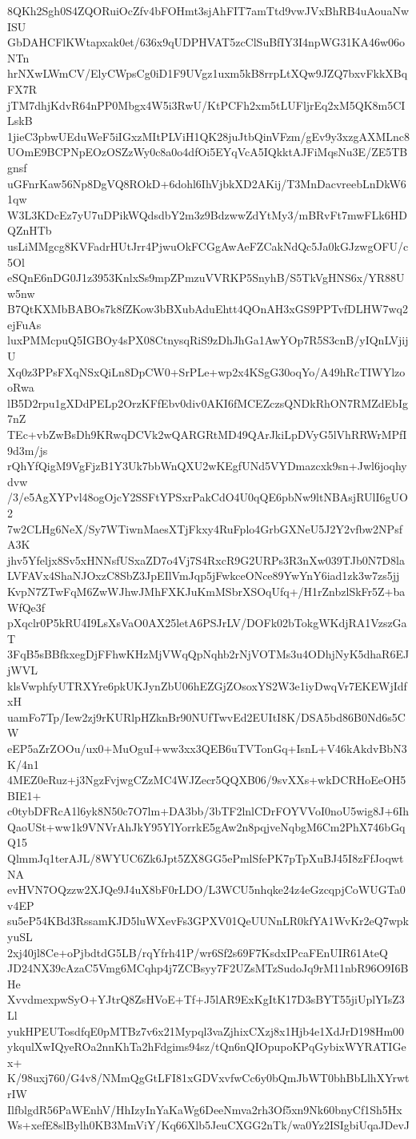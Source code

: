 8QKh2Sgh0S4ZQORuiOcZfv4bFOHmt3sjAhFIT7amTtd9vwJVxBhRB4uAouaNwISU
GbDAHCFlKWtapxak0et/636x9qUDPHVAT5zcClSuBfIY3I4npWG31KA46w06oNTn
hrNXwLWmCV/ElyCWpsCg0iD1F9UVgz1uxm5kB8rrpLtXQw9JZQ7bxvFkkXBqFX7R
jTM7dhjKdvR64nPP0Mbgx4W5i3RwU/KtPCFh2xm5tLUFljrEq2xM5QK8m5CILskB
1jieC3pbwUEduWeF5iIGxzMItPLViH1QK28juJtbQinVFzm/gEv9y3xzgAXMLnc8
UOmE9BCPNpEOzOSZzWy0c8a0o4dfOi5EYqVcA5IQkktAJFiMqsNu3E/ZE5TBgnsf
uGFnrKaw56Np8DgVQ8ROkD+6dohl6IhVjbkXD2AKij/T3MnDacvreebLnDkW61qw
W3L3KDcEz7yU7uDPikWQdsdbY2m3z9BdzwwZdYtMy3/mBRvFt7mwFLk6HDQZnHTb
usLiMMgcg8KVFadrHUtJrr4PjwuOkFCGgAwAeFZCakNdQc5Ja0kGJzwgOFU/c5Ol
eSQnE6nDG0J1z3953KnlxSs9mpZPmzuVVRKP5SnyhB/S5TkVgHNS6x/YR88Uw5nw
B7QtKXMbBABOs7k8fZKow3bBXubAduEhtt4QOnAH3xGS9PPTvfDLHW7wq2ejFuAs
luxPMMcpuQ5IGBOy4sPX08CtnysqRiS9zDhJhGa1AwYOp7R5S3cnB/yIQnLVjijU
Xq0z3PPsFXqNSxQiLn8DpCW0+SrPLe+wp2x4KSgG30oqYo/A49hRcTIWYlzooRwa
lB5D2rpu1gXDdPELp2OrzKFfEbv0div0AKI6fMCEZczsQNDkRhON7RMZdEbIg7nZ
TEc+vbZwBsDh9KRwqDCVk2wQARGRtMD49QArJkiLpDVyG5lVhRRWrMPfI9d3m/js
rQhYfQigM9VgFjzB1Y3Uk7bbWnQXU2wKEgfUNd5VYDmazcxk9sn+Jwl6joqhydvw
/3/e5AgXYPvl48ogOjcY2SSFtYPSxrPakCdO4U0qQE6pbNw9ltNBAsjRUlI6gUO2
7w2CLHg6NeX/Sy7WTiwnMaesXTjFkxy4RuFplo4GrbGXNeU5J2Y2vfbw2NPsfA3K
jhv5Yfeljx8Sv5xHNNsfUSxaZD7o4Vj7S4RxcR9G2URPs3R3nXw039TJb0N7D8la
LVFAVx4ShaNJOxzC8SbZ3JpEIlVmJqp5jFwkceONce89YwYnY6iad1zk3w7zs5jj
KvpN7ZTwFqM6ZwWJhwJMhFXKJuKmMSbrXSOqUfq+/H1rZnbzlSkFr5Z+baWfQe3f
pXqclr0P5kRU4I9LsXsVaO0AX25letA6PSJrLV/DOFk02bTokgWKdjRA1VzszGaT
3FqB5sBBfkxegDjFFhwKHzMjVWqQpNqhb2rNjVOTMs3u4ODhjNyK5dhaR6EJjWVL
klsVwphfyUTRXYre6pkUKJynZbU06hEZGjZOsoxYS2W3e1iyDwqVr7EKEWjIdfxH
uamFo7Tp/Iew2zj9rKURlpHZknBr90NUfTwvEd2EUItI8K/DSA5bd86B0Nd6s5CW
eEP5aZrZOOu/ux0+MuOguI+ww3xx3QEB6uTVTonGq+IsnL+V46kAkdvBbN3K/4n1
4MEZ0eRuz+j3NgzFvjwgCZzMC4WJZecr5QQXB06/9svXXs+wkDCRHoEeOH5BIE1+
c0tybDFRcA1l6yk8N50c7O7lm+DA3bb/3bTF2lnlCDrFOYVVoI0noU5wig8J+6Ih
QaoUSt+ww1k9VNVrAhJkY95YlYorrkE5gAw2n8pqjveNqbgM6Cm2PhX746bGqQ15
QlmmJq1terAJL/8WYUC6Zk6Jpt5ZX8GG5ePmlSfePK7pTpXuBJ45I8zFfJoqwtNA
evHVN7OQzzw2XJQe9J4uX8bF0rLDO/L3WCU5nhqke24z4eGzcqpjCoWUGTa0v4EP
su5eP54KBd3RssamKJD5luWXevFs3GPXV01QeUUNnLR0kfYA1WvKr2eQ7wpkyuSL
2xj40jl8Ce+oPjbdtdG5LB/rqYfrh41P/wr6Sf2s69F7KsdxIPcaFEnUIR61AteQ
JD24NX39cAzaC5Vmg6MCqhp4j7ZCBsyy7F2UZsMTzSudoJq9rM11nbR96O9I6BHe
XvvdmexpwSyO+YJtrQ8ZsHVoE+Tf+J5lAR9ExKgItK17D3sBYT55jiUplYIsZ3Ll
yukHPEUTosdfqE0pMTBz7v6x21Mypql3vaZjhixCXzj8x1Hjb4e1XdJrD198Hm00
ykqulXwIQyeROa2nnKhTa2hFdgims94sz/tQn6nQIOpupoKPqGybixWYRATIGex+
K/98uxj760/G4v8/NMmQgGtLFI81xGDVxvfwCc6y0bQmJbWT0bhBbLlhXYrwtrIW
IlfblgdR56PaWEnhV/HhIzyInYaKaWg6DeeNmva2rh3Of5xn9Nk60bnyCf1Sh5Hx
Ws+xefE8slBylh0KB3MmViY/Kq66Xlb5JeuCXGG2nTk/wa0Yz2ISIgbiUqaJDevJ
